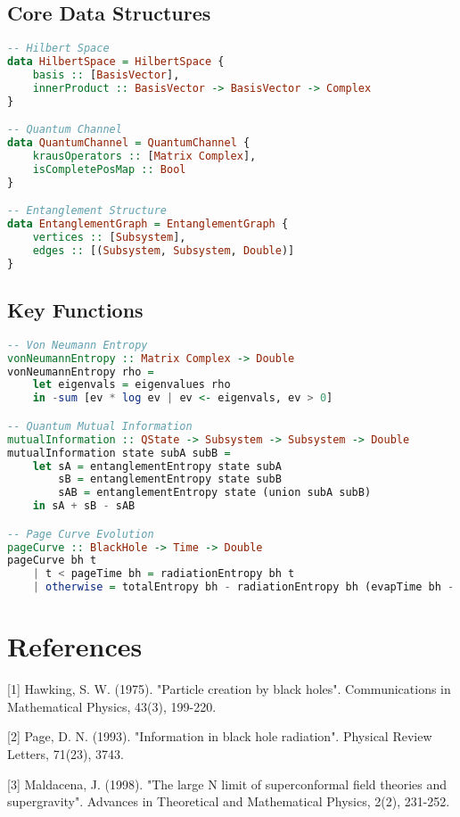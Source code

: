 \documentclass[12pt,a4paper]{article}
\begin{document}
\subsection{Core Data Structures}

\begin{lstlisting}[language=Haskell]
-- Hilbert Space
data HilbertSpace = HilbertSpace {
    basis :: [BasisVector],
    innerProduct :: BasisVector -> BasisVector -> Complex
}

-- Quantum Channel
data QuantumChannel = QuantumChannel {
    krausOperators :: [Matrix Complex],
    isCompletePosMap :: Bool
}

-- Entanglement Structure
data EntanglementGraph = EntanglementGraph {
    vertices :: [Subsystem],
    edges :: [(Subsystem, Subsystem, Double)]
}
\end{lstlisting}

\subsection{Key Functions}

\begin{lstlisting}[language=Haskell]
-- Von Neumann Entropy
vonNeumannEntropy :: Matrix Complex -> Double
vonNeumannEntropy rho = 
    let eigenvals = eigenvalues rho
    in -sum [ev * log ev | ev <- eigenvals, ev > 0]

-- Quantum Mutual Information
mutualInformation :: QState -> Subsystem -> Subsystem -> Double
mutualInformation state subA subB = 
    let sA = entanglementEntropy state subA
        sB = entanglementEntropy state subB
        sAB = entanglementEntropy state (union subA subB)
    in sA + sB - sAB

-- Page Curve Evolution
pageCurve :: BlackHole -> Time -> Double
pageCurve bh t
    | t < pageTime bh = radiationEntropy bh t
    | otherwise = totalEntropy bh - radiationEntropy bh (evapTime bh - t)
\end{lstlisting}

\section{References}

[1] Hawking, S. W. (1975). "Particle creation by black holes". Communications in Mathematical Physics, 43(3), 199-220.

[2] Page, D. N. (1993). "Information in black hole radiation". Physical Review Letters, 71(23), 3743.

[3] Maldacena, J. (1998). "The large N limit of superconformal field theories and supergravity". Advances in Theoretical and Mathematical Physics, 2(2), 231-252.
\end{document}
